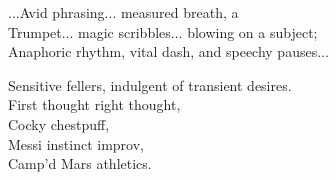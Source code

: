 ...Avid phrasing... measured breath, a \\
Trumpet... magic scribbles... blowing on a subject; \\
Anaphoric rhythm, vital dash, and speechy pauses...

Sensitive fellers, indulgent of transient desires. \\
First thought right thought, \\
Cocky chestpuff, \\ %
Messi instinct improv, \\ %
Camp'd Mars athletics.